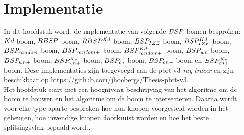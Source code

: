 \chapter{Implementatie}
\label{hoofdstuk:implementatie}
In dit hoofdstuk wordt de implementatie van volgende $BSP$ bomen besproken: $Kd$ boom, $RBSP$ boom, $RBSP^{Kd}$ boom, $BSP_{IZE}$ boom, $BSP^{Kd}_{IZE}$ boom, $BSP_{random}$ boom, $BSP_{random+}$ boom, $BSP^{Kd}_{random+}$ boom, $BSP_{wn}$ boom, $BSP_{wn+}$ boom, $BSP^{Kd}_{wn+}$ boom, $BSP_{cn}$ boom, $BSP_{cn+}$ boom en $BSP^{Kd}_{cn+}$ boom.
Deze implementaties zijn toegevoegd aan de pbrt-v3 \textit{ray tracer} \cite{pbrt} en zijn beschikbaar op \url{https://github.com/jhoobergs/Thesis-pbrt-v3}.\\

Het hoofdstuk start met een hoogniveau beschrijving van het algoritme om de boom te bouwen en het algoritme om de boom te intersecteren.
Daarna wordt voor elke type aparte besproken hoe hun knopen voorgesteld worden in het geheugen, hoe inwendige knopen doorkruist worden en hoe het beste splitsingsvlak bepaald wordt.

\lstset{style=pseudoStyle}


